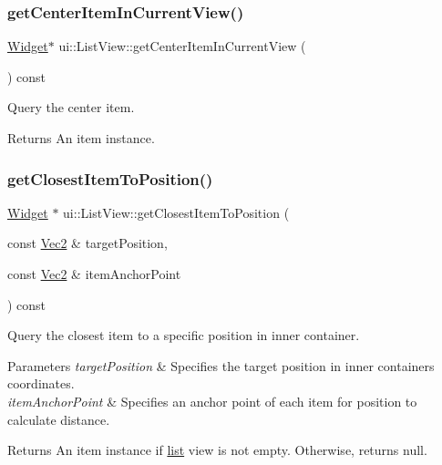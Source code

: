 \subsubsection{\texorpdfstring{get\+Center\+Item\+In\+Current\+View()}{getCenterItemInCurrentView()}\hspace{0.1cm}{\footnotesize\ttfamily [2/2]}}
{\footnotesize\ttfamily \hyperlink{classui_1_1Widget}{Widget}$\ast$ ui\+::\+List\+View\+::get\+Center\+Item\+In\+Current\+View (\begin{DoxyParamCaption}{ }\end{DoxyParamCaption}) const}



Query the center item. 

\begin{DoxyReturn}{Returns}
An item instance. 
\end{DoxyReturn}
\mbox{\label{classui_1_1ListView_a1a6b73d54545ff7e1e4631185472b2eb}} 
\subsubsection{\texorpdfstring{get\+Closest\+Item\+To\+Position()}{getClosestItemToPosition()}\hspace{0.1cm}{\footnotesize\ttfamily [1/2]}}
{\footnotesize\ttfamily \hyperlink{classui_1_1Widget}{Widget} $\ast$ ui\+::\+List\+View\+::get\+Closest\+Item\+To\+Position (\begin{DoxyParamCaption}\item[{const \hyperlink{classVec2}{Vec2} \&}]{target\+Position,  }\item[{const \hyperlink{classVec2}{Vec2} \&}]{item\+Anchor\+Point }\end{DoxyParamCaption}) const}



Query the closest item to a specific position in inner container. 


\begin{DoxyParams}{Parameters}
{\em target\+Position} & Specifies the target position in inner container\textquotesingle{}s coordinates. \\
\hline
{\em item\+Anchor\+Point} & Specifies an anchor point of each item for position to calculate distance. \\
\hline
\end{DoxyParams}
\begin{DoxyReturn}{Returns}
An item instance if \hyperlink{protocollist-p}{list} view is not empty. Otherwise, returns null. 
\end{DoxyReturn}
\mbox{\label{classui_1_1ListView_a3b735d6f86e49897cfa1fd064b43e1e9}} 
